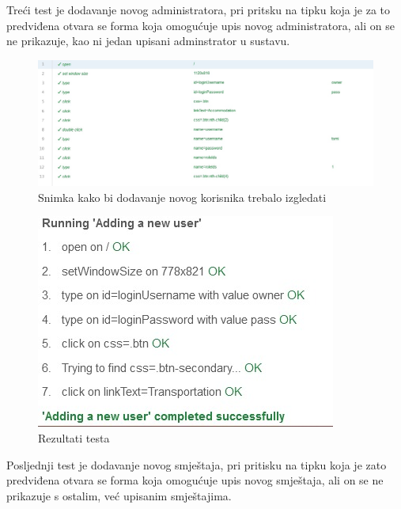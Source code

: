 			Treći test je dodavanje novog administratora, pri pritsku na tipku koja je za to predviđena otvara se forma koja omogućuje upis novog administratora, ali on se ne prikazuje, kao ni jedan upisani adminstrator u sustavu.
			
			\begin{figure}[H]
				\includegraphics[width=\textwidth]{slike/addingANewAdminTest.JPG}
				\caption{Snimka kako bi dodavanje novog korisnika trebalo izgledati}
				\label{addingANewAdminTest}
			\end{figure}
			
			\begin{figure}[H]
				\includegraphics[width=\textwidth]{slike/addingANewUserResults.JPG}
				\caption{Rezultati testa}
				\label{addingANewAdinResults}
			\end{figure}
			
			Posljednji test je dodavanje novog smještaja, pri pritisku na tipku koja je zato predviđena otvara se forma koja omogućuje upis novog smještaja, ali on se ne prikazuje s ostalim, već upisanim smještajima.
			
